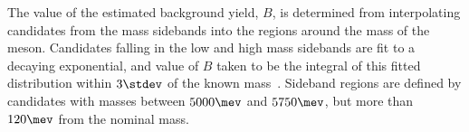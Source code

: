 
The value of the estimated background yield, $B$, is determined from interpolating
\btokpipimumu candidates from the mass sidebands into the regions around the mass of the \Bp meson.
Candidates falling in the low and high mass sidebands are fit to a decaying exponential, and
value of $B$ taken to be the integral of this fitted distribution within $3\stdev$ of the known \Bp
mass~\cite{PDG2012}.
Sideband regions are defined by \Bp candidates with masses between $5000\mev$ and $5750\mev$, but
more than $120\mev$ from the nominal \Bp mass.





